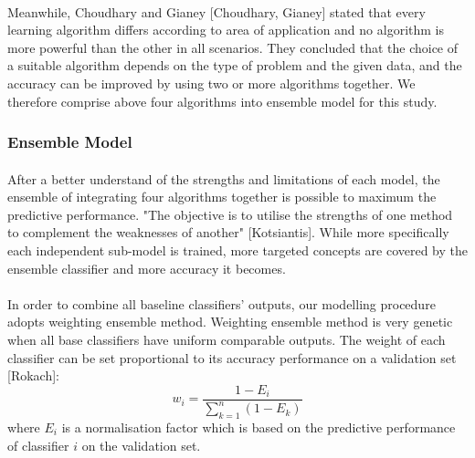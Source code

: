 \documentclass[runningheads]{llncs}
\begin{document}
\paragraph{}
Meanwhile, Choudhary and Gianey [Choudhary, Gianey] stated that every learning algorithm differs according to area of application and no algorithm is more powerful than the other in all scenarios. They concluded that the choice of a suitable algorithm depends on the type of problem and the given data, and the accuracy can be improved by using two or more algorithms together. We therefore comprise above four algorithms into ensemble model for this study.
%
\subsubsection{Ensemble Model}
%
\paragraph{}
After a better understand of the strengths and limitations of each model, the ensemble of integrating four algorithms together is possible to maximum the predictive performance. "The objective is to utilise the strengths of one method to complement the weaknesses of another" [Kotsiantis]. While more specifically each independent sub-model is trained, more targeted concepts are covered by the ensemble classifier and more accuracy it becomes. 
%
%
\paragraph{}
In order to combine all baseline classifiers' outputs, our modelling procedure adopts weighting ensemble method. Weighting ensemble method is very genetic when all base classifiers have uniform comparable outputs. The weight of each classifier can be set proportional to its accuracy performance on a validation set [Rokach]:\\
\begin{equation}\label{reio}
	w_{i} = \frac{1 - E_{i} }{\sum_{k = 1}^{n} (1 - E_{k}) } 
\end{equation}
where $E_{i} $ is a normalisation factor which is based on the predictive performance of classifier $i$ on the validation set. 
\end{document}

